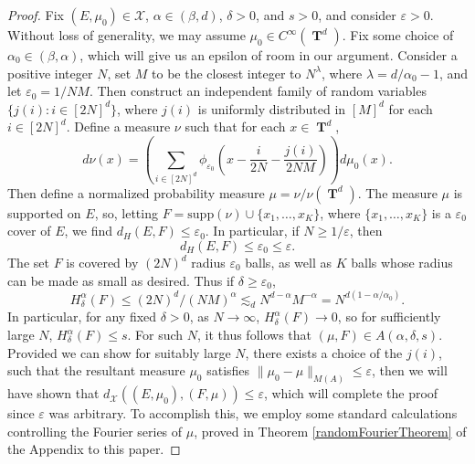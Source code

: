 \documentclass[12pt,reqno]{article}
\DeclareMathOperator{\TT}{\mathbf{T}}
\begin{document}
\begin{proof}
    Fix $(E,\mu_0) \in \mathcal{X}$, $\alpha \in (\beta,d)$, $\delta > 0$, and $s > 0$, and consider $\varepsilon > 0$. Without loss of generality, we may assume $\mu_0 \in C^\infty(\TT^d)$. Fix some choice of $\alpha_0 \in (\beta,\alpha)$, which will give us an epsilon of room in our argument. Consider a positive integer $N$, set $M$ to be the closest integer to $N^\lambda$, where $\lambda = d/\alpha_0 - 1$, and let $\varepsilon_0 = 1/NM$. Then construct an independent family of random variables $\{ j(i) : i \in [2N]^d \}$, where $j(i)$ is uniformly distributed in $[M]^d$ for each $i \in [2N]^d$. Define a measure $\nu$ such that for each $x \in \TT^d$,
    \[ d\nu(x) = \left( \sum_{i \in [2N]^d} \phi_{\varepsilon_0} \left( x - \frac{i}{2N} - \frac{j(i)}{2NM} \right) \right) d\mu_0(x). \]
    Then define a normalized probability measure $\mu = \nu / \nu(\TT^d)$. The measure $\mu$ is supported on $E$, so, letting $F = \text{supp}(\nu) \cup \{ x_1, \dots, x_K \}$, where $\{ x_1, \dots, x_K \}$ is a $\varepsilon_0$ cover of $E$, we find $d_H(E,F) \leq \varepsilon_0$. In particular, if $N \geq 1/\varepsilon$, then
    \begin{equation} \label{equation19230124574}
        d_H(E,F) \leq \varepsilon_0 \leq \varepsilon.
    \end{equation}
    The set $F$ is covered by $(2N)^d$ radius $\varepsilon_0$ balls, as well as $K$ balls whose radius can be made as small as desired. Thus if $\delta \geq \varepsilon_0$,
    \[ H^\alpha_\delta(F) \leq (2N)^d / (NM)^\alpha \lesssim_d N^{d-\alpha} M^{-\alpha} = N^{d(1 - \alpha/\alpha_0)}. \]
    In particular, for any fixed $\delta > 0$, as $N \to \infty$, $H^\alpha_\delta(F) \to 0$, so for sufficiently large $N$, $H^\alpha_\delta(F) \leq s$. For such $N$, it thus follows that $(\mu,F) \in A(\alpha,\delta,s)$. Provided we can show for suitably large $N$, there exists a choice of the $j(i)$, such that the resultant measure $\mu_0$ satisfies $\| \mu_0 - \mu \|_{M(A)} \leq \varepsilon$, then we will have shown that $d_{\mathcal{X}}((E,\mu_0),(F,\mu)) \leq \varepsilon$, which will complete the proof since $\varepsilon$ was arbitrary. To accomplish this, we employ some standard calculations controlling the Fourier series of $\mu$, proved in Theorem \ref{randomFourierTheorem} of the Appendix to this paper.


\end{proof}
\end{document}
